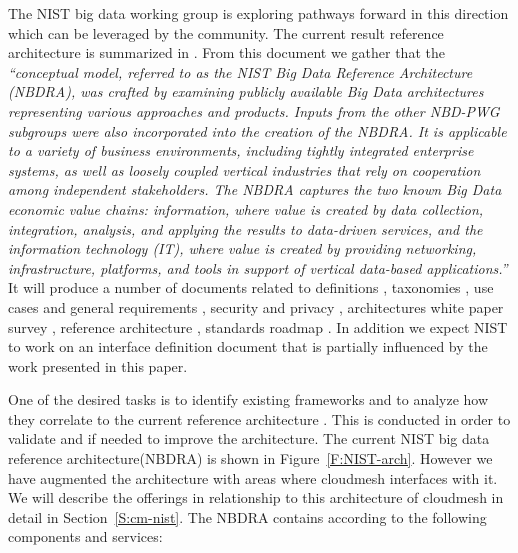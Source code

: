 The NIST big data working group is exploring pathways forward in this
direction which can be leveraged by the community. The current result
reference architecture is summarized in \cite{nist-bd}. From this
document we gather that the {\it ``conceptual model, referred to as
  the NIST Big Data Reference Architecture (NBDRA), was crafted by
  examining publicly available Big Data architectures representing
  various approaches and products. Inputs from the other NBD-PWG
  subgroups were also incorporated into the creation of the NBDRA. It
  is applicable to a variety of business environments, including
  tightly integrated enterprise systems, as well as loosely coupled
  vertical industries that rely on cooperation among independent
  stakeholders. The NBDRA captures the two known Big Data economic
  value chains: information, where value is created by data
  collection, integration, analysis, and applying the results to
  data-driven services, and the information technology (IT), where
  value is created by providing networking, infrastructure, platforms,
  and tools in support of vertical data-based applications.''}  It
will produce a number of documents related to definitions
\cite{nist-bd-v1}, taxonomies \cite{nist-bd-v2}, use cases and general
requirements \cite{nist-bd-v3}, security and privacy
\cite{nist-bd-v4}, architectures white paper survey \cite{nist-bd-v5},
reference architecture \cite{nist-bd}, standards roadmap
\cite{nist-bd-v7}. In addition we expect NIST to work on an interface
definition document that is partially influenced by the work presented
in this paper.

One of the desired tasks is to identify existing frameworks and to
analyze how they correlate to the current reference architecture
\cite{nist-bd}. This is conducted in order to validate and if needed
to improve the architecture.  The current NIST big data reference
architecture(NBDRA) is shown in Figure~\ref{F:NIST-arch}. However we
have augmented the architecture with areas where cloudmesh interfaces
with it. We will describe the offerings in relationship to this
architecture of cloudmesh in detail in Section~\ref{S:cm-nist}.  The
NBDRA contains according to \cite{nist-bd} the following components
and services:

